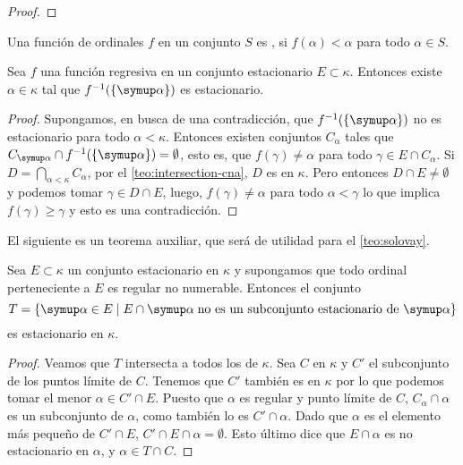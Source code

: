 \begin{proof}
\end{proof}

\begin{defi}
    Una función de ordinales $f$ en un conjunto $S$ es , si
    $f(\alpha)<\alpha$ para todo $\alpha\in S$.
\end{defi}

\begin{teo}[Fodor]\label{teo:fodor}
    Sea $f$ una función regresiva en un conjunto estacionario $E\subset\kappa$.
    Entonces existe $\alpha\in\kappa$ tal que $f^{-1}(\set{\alpha})$ es estacionario.
\end{teo}

\begin{proof}
    Supongamos, en busca de una contradicción, que $f^{-1}(\set{\alpha})$ no es estacionario
    para todo $\alpha<\kappa$. Entonces existen conjuntos \cna{} $C_\alpha$ tales que
    $C_\alpha\cap f^{-1}(\set{\alpha}) = \emptyset$, esto es,
    que $f(\gamma)\neq\alpha$ para todo $\gamma\in E\cap C_\alpha$.
    Si $D=\dint_{\alpha<\kappa} C_\alpha$,
    por el \cref{teo:intersection-cna}, $D$ es \cna{} en $\kappa$.
    Pero entonces $D\cap E\neq\emptyset$ y podemos tomar $\gamma\in D\cap E$,
    luego, $f(\gamma)\neq\alpha$ para todo $\alpha<\gamma$
    lo que implica $f(\gamma)\geq\gamma$ y esto es una contradicción.
\end{proof}

El siguiente es un teorema auxiliar, que será de utilidad para el \cref{teo:solovay}.

\begin{teo}\label{teo:stationary}
    Sea $E\subset\kappa$ un conjunto estacionario en $\kappa$ y supongamos que todo
    ordinal perteneciente a $E$ es regular no numerable. Entonces el conjunto
    \[
        T=\set{\alpha\in E\mid
            E\cap\alpha\;\text{no es un subconjunto estacionario de $\alpha$}}
    \]
    es estacionario en $\kappa$.
\end{teo}

\begin{proof}
    Veamos que $T$ intersecta a todos los \cna{} de $\kappa$.
    Sea $C$ \cna{} en $\kappa$ y $C'$ el subconjunto de los puntos límite de $C$.
    Tenemos que $C'$ también es \cna{} en $\kappa$ por lo que podemos tomar
    el menor $\alpha\in C'\cap E$.
    Puesto que $\alpha$ es regular y punto límite de $C$, $C_\alpha\cap\alpha$ es un subconjunto
    \cna{} de $\alpha$, como también lo es $C'\cap\alpha$. Dado que $\alpha$ es el elemento
    más pequeño de $C'\cap E$, $C'\cap E\cap\alpha = \emptyset$. Esto último
    dice que $E\cap\alpha$ es no estacionario en $\alpha$, y $\alpha\in T\cap C$.
\end{proof}

